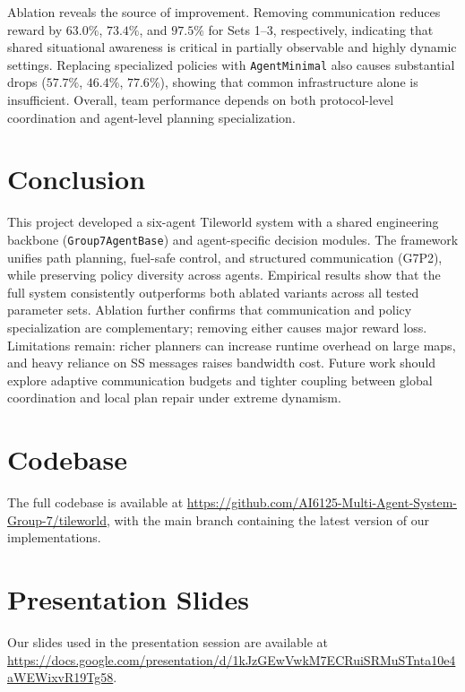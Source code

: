 \documentclass{article}
\begin{document}
Ablation reveals the source of improvement. Removing communication reduces reward by \(63.0\%\), \(73.4\%\), and \(97.5\%\) for Sets 1--3, respectively, indicating that shared situational awareness is critical in partially observable and highly dynamic settings. Replacing specialized policies with \texttt{AgentMinimal} also causes substantial drops (\(57.7\%\), \(46.4\%\), \(77.6\%\)), showing that common infrastructure alone is insufficient. Overall, team performance depends on both protocol-level coordination and agent-level planning specialization.

\section{Conclusion}

This project developed a six-agent Tileworld system with a shared engineering backbone (\texttt{Group7AgentBase}) and agent-specific decision modules.
The framework unifies path planning, fuel-safe control, and structured communication (G7P2), while preserving policy diversity across agents.
Empirical results show that the full system consistently outperforms both ablated variants across all tested parameter sets.
Ablation further confirms that communication and policy specialization are complementary; removing either causes major reward loss.
Limitations remain: richer planners can increase runtime overhead on large maps, and heavy reliance on SS messages raises bandwidth cost.
Future work should explore adaptive communication budgets and tighter coupling between global coordination and local plan repair under extreme dynamism.

  
  


\section{Codebase}
The full codebase is available at \url{https://github.com/AI6125-Multi-Agent-System-Group-7/tileworld}, with the main branch containing the latest version of our implementations.

\section{Presentation Slides}
Our slides used in the presentation session are available at \url{https://docs.google.com/presentation/d/1kJzGEwVwkM7ECRuiSRMuSTnta10e4aWEWixvR19Tg58}.
\end{document}
